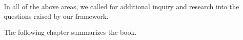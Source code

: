 \noindent{}In all of the above areas, we called for additional 
inquiry and research 
into the questions raised by our framework.

The following chapter summarizes the book. 








%
%




